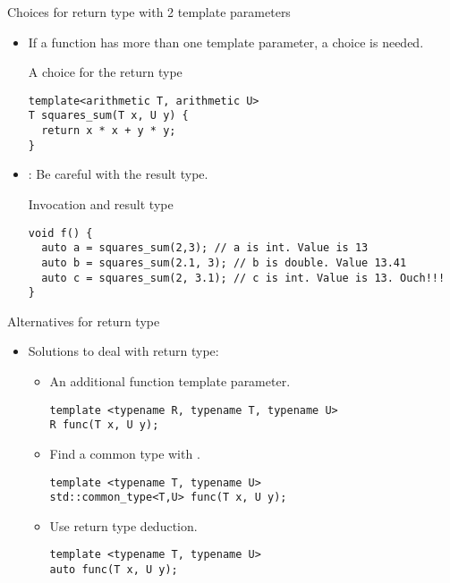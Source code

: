 \begin{frame}[t,fragile]{Choices for return type with 2 template parameters}

\begin{itemize}
  \item If a function has more than one template parameter, a choice is needed.

\begin{block}{A choice for the return type}
\begin{lstlisting}
template<arithmetic T, arithmetic U>
T squares_sum(T x, U y) {
  return x * x + y * y;
}
\end{lstlisting}
\end{block}

  \item {}: Be careful with the result type.

\begin{block}{Invocation and result type}
\begin{lstlisting}
void f() {
  auto a = squares_sum(2,3); // a is int. Value is 13
  auto b = squares_sum(2.1, 3); // b is double. Value 13.41
  auto c = squares_sum(2, 3.1); // c is int. Value is 13. Ouch!!!
}
\end{lstlisting}
\end{block}

\end{itemize}
\end{frame}

\begin{frame}[t,fragile]{Alternatives for return type}
\begin{itemize}
  \item Solutions to deal with return type:
    \begin{itemize}
      \item An additional function template parameter.
\begin{lstlisting}
template <typename R, typename T, typename U>
R func(T x, U y);
\end{lstlisting}

      \item Find a common type with .
\begin{lstlisting}
template <typename T, typename U>
std::common_type<T,U> func(T x, U y);
\end{lstlisting}

      \item Use return type deduction.
\begin{lstlisting}
template <typename T, typename U>
auto func(T x, U y);
\end{lstlisting}

    \end{itemize}
\end{itemize}
\end{frame}
